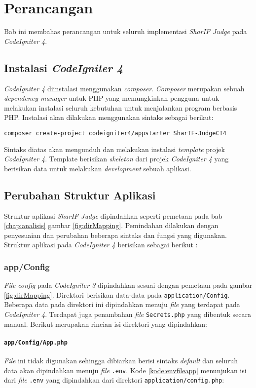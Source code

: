 \chapter{Perancangan}
\label{chap:perancangan}
Bab ini membahas perancangan untuk seluruh implementasi \textit{SharIF Judge} pada \textit{CodeIgniter 4}.

\section{Instalasi \textit{CodeIgniter 4}}
\textit{CodeIgniter 4} diinstalasi menggunakan \textit{composer}. \textit{Composer} merupakan sebuah \textit{dependency manager} untuk PHP yang memungkinkan pengguna untuk melakukan instalasi seluruh kebutuhan untuk menjalankan program berbasis PHP. Instalasi akan dilakukan menggunakan sintaks sebagai berikut:

\begin{center}
\verb|composer create-project codeigniter4/appstarter SharIF-JudgeCI4|
\end{center}

Sintaks diatas akan mengunduh dan melakukan instalasi \textit{template} projek \textit{CodeIgniter 4}. Template berisikan \textit{skeleton} dari projek \textit{CodeIgniter 4} yang berisikan data untuk melakukan \textit{development} sebuah aplikasi.

\section{Perubahan Struktur Aplikasi}
\label{sec:perubahanStruktur}
Struktur aplikasi \textit{SharIF Judge} dipindahkan seperti pemetaan pada bab \ref{chap:analisis} gambar \ref{fig:dirMapping}. Pemindahan dilakukan dengan penyesuaian dan perubahan beberapa sintaks dan fungsi yang digunakan. Struktur aplikasi pada \textit{CodeIgniter 4} berisikan sebagai berikut :
\subsection{app/Config}
\textit{File} \textit{config} pada \textit{CodeIgniter 3} dipindahkan sesuai dengan pemetaan pada gambar \ref{fig:dirMapping}. Direktori berisikan data-data pada \texttt{application/Config}. Beberapa data pada direktori ini dipindahkan menuju \textit{file} yang terdapat pada \textit{CodeIgniter 4}. Terdapat juga penambahan \textit{file} \texttt{Secrets.php} yang dibentuk secara manual. Berikut merupakan rincian isi direktori yang dipindahkan:
\subsubsection{\texttt{app/Config/App.php}}
\textit{File} ini tidak digunakan sehingga dibiarkan berisi sintaks \textit{default} dan seluruh data akan dipindahkan menuju \textit{file} \texttt{.env}. Kode \ref{kode:envfileapp} menunjukan isi dari \textit{file} \texttt{.env} yang dipindahkan dari direktori \texttt{application/config.php}:

